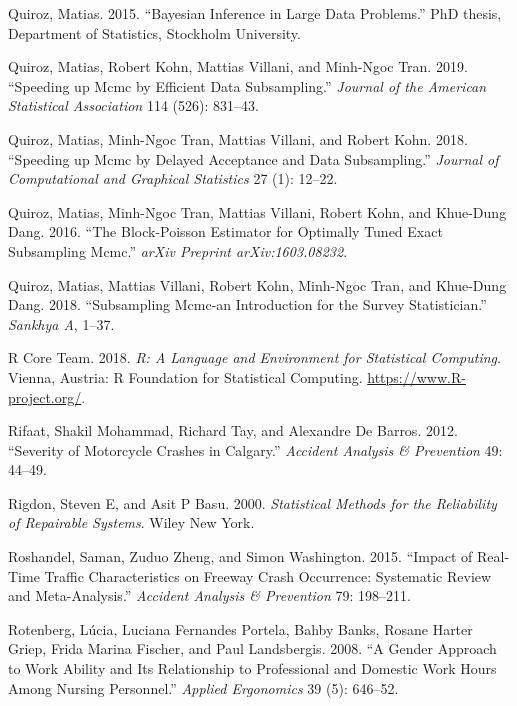 \documentclass[12pt]{book}
\numberwithin{equation}{chapter}
\begin{document}
\leavevmode\hypertarget{ref-quiroz2015bayesian}{}%
Quiroz, Matias. 2015. ``Bayesian Inference in Large Data Problems.'' PhD thesis, Department of Statistics, Stockholm University.

\leavevmode\hypertarget{ref-quiroz2019speeding}{}%
Quiroz, Matias, Robert Kohn, Mattias Villani, and Minh-Ngoc Tran. 2019. ``Speeding up Mcmc by Efficient Data Subsampling.'' \emph{Journal of the American Statistical Association} 114 (526): 831--43.

\leavevmode\hypertarget{ref-quiroz2018speeding}{}%
Quiroz, Matias, Minh-Ngoc Tran, Mattias Villani, and Robert Kohn. 2018. ``Speeding up Mcmc by Delayed Acceptance and Data Subsampling.'' \emph{Journal of Computational and Graphical Statistics} 27 (1): 12--22.

\leavevmode\hypertarget{ref-quiroz2016block}{}%
Quiroz, Matias, Minh-Ngoc Tran, Mattias Villani, Robert Kohn, and Khue-Dung Dang. 2016. ``The Block-Poisson Estimator for Optimally Tuned Exact Subsampling Mcmc.'' \emph{arXiv Preprint arXiv:1603.08232}.

\leavevmode\hypertarget{ref-quiroz2018subsampling}{}%
Quiroz, Matias, Mattias Villani, Robert Kohn, Minh-Ngoc Tran, and Khue-Dung Dang. 2018. ``Subsampling Mcmc-an Introduction for the Survey Statistician.'' \emph{Sankhya A}, 1--37.

\leavevmode\hypertarget{ref-Rcitation}{}%
R Core Team. 2018. \emph{R: A Language and Environment for Statistical Computing}. Vienna, Austria: R Foundation for Statistical Computing. \url{https://www.R-project.org/}.

\leavevmode\hypertarget{ref-rifaat2012severity}{}%
Rifaat, Shakil Mohammad, Richard Tay, and Alexandre De Barros. 2012. ``Severity of Motorcycle Crashes in Calgary.'' \emph{Accident Analysis \& Prevention} 49: 44--49.

\leavevmode\hypertarget{ref-rigdon2000statistical}{}%
Rigdon, Steven E, and Asit P Basu. 2000. \emph{Statistical Methods for the Reliability of Repairable Systems}. Wiley New York.

\leavevmode\hypertarget{ref-roshandel2015impact}{}%
Roshandel, Saman, Zuduo Zheng, and Simon Washington. 2015. ``Impact of Real-Time Traffic Characteristics on Freeway Crash Occurrence: Systematic Review and Meta-Analysis.'' \emph{Accident Analysis \& Prevention} 79: 198--211.

\leavevmode\hypertarget{ref-rotenberg2008gender}{}%
Rotenberg, Lúcia, Luciana Fernandes Portela, Bahby Banks, Rosane Harter Griep, Frida Marina Fischer, and Paul Landsbergis. 2008. ``A Gender Approach to Work Ability and Its Relationship to Professional and Domestic Work Hours Among Nursing Personnel.'' \emph{Applied Ergonomics} 39 (5): 646--52.
\end{document}
